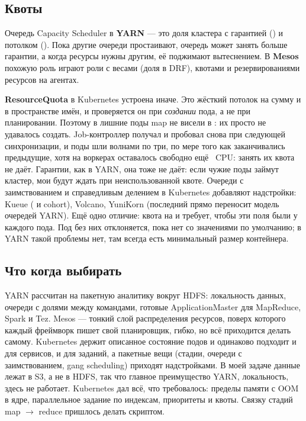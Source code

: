 \subsection{Квоты}

Очередь Capacity Scheduler в \textbf{YARN} --- это доля кластера с гарантией () и потолком (). Пока другие очереди простаивают, очередь может занять больше гарантии, а когда ресурсы нужны другим, её поджимают вытеснением. В \textbf{Mesos} похожую роль играют роли с весами (доля в DRF), квотами и резервированиями ресурсов на агентах.

\textbf{ResourceQuota} в Kubernetes устроена иначе. Это жёсткий потолок на сумму  и  в пространстве имён, и проверяется он при \emph{создании} пода, а не при планировании. Поэтому в  лишние поды map не висели в : их просто не удавалось создать. Job-контроллер получал  и пробовал снова при следующей синхронизации, и поды шли волнами по три, по мере того как заканчивались предыдущие, хотя на воркерах оставалось свободно ещё \quotaFreeCpu\ CPU: занять их квота не даёт. Гарантии, как в YARN, она тоже не даёт: если чужие поды займут кластер, мои будут ждать при неиспользованной квоте. Очереди с заимствованием и справедливым делением в Kubernetes добавляют надстройки: Kueue ( и cohort), Volcano, YuniKorn (последний прямо переносит модель очередей YARN). Ещё одно отличие: квота на  и  требует, чтобы эти поля были у каждого пода. Под без них отклоняется, пока нет  со значениями по умолчанию; в YARN такой проблемы нет, там всегда есть минимальный размер контейнера.

\subsection{Что когда выбирать}

YARN рассчитан на пакетную аналитику вокруг HDFS: локальность данных, очереди с долями между командами, готовые ApplicationMaster для MapReduce, Spark и Tez. Mesos --- тонкий слой распределения ресурсов, поверх которого каждый фреймворк пишет свой планировщик, гибко, но всё приходится делать самому. Kubernetes держит описанное состояние подов и одинаково подходит и для сервисов, и для заданий, а пакетные вещи (стадии, очереди с заимствованием, gang scheduling) приходят надстройками. В моей задаче данные лежат в S3, а не в HDFS, так что главное преимущество YARN, локальность, здесь не работает. Kubernetes дал всё, что требовалось: пределы памяти с OOM в ядре, параллельное задание по индексам, приоритеты и квоты. Связку стадий map $\to$ reduce пришлось делать скриптом.
